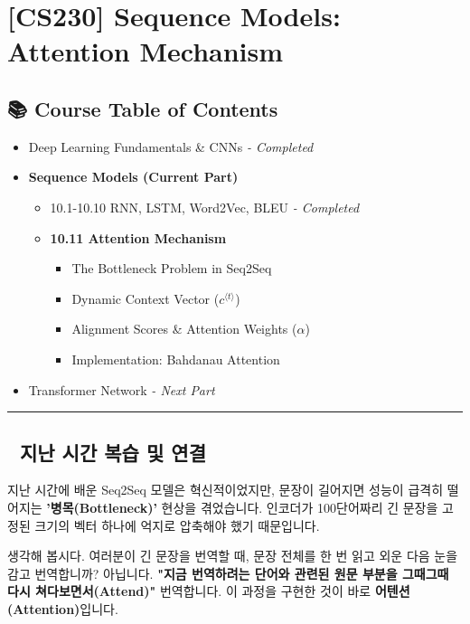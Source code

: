\documentclass[11pt,a4paper]{book}
\theoremstyle{definition}
\begin{document}
\chapter{[CS230] Sequence Models: \\ Attention Mechanism}
\label{ch:lecture49}

\section*{📚 Course Table of Contents}
\begin{itemize}
    \item[Chapter 1-9.] Deep Learning Fundamentals \& CNNs \textit{- Completed}
    \item[\textbf{Chapter 10.}] \textbf{Sequence Models (Current Part)}
    \begin{itemize}
        \item 10.1-10.10 RNN, LSTM, Word2Vec, BLEU \textit{- Completed}
        \item \textbf{10.11 Attention Mechanism}
        \begin{itemize}
            \item The Bottleneck Problem in Seq2Seq
            \item Dynamic Context Vector ($c^{\langle t \rangle}$)
            \item Alignment Scores \& Attention Weights ($\alpha$)
            \item Implementation: Bahdanau Attention
        \end{itemize}
    \end{itemize}
    \item[Chapter 11.] Transformer Network \textit{- Next Part}
\end{itemize}

\vspace{0.5cm}
\hrule
\vspace{0.5cm}

\section*{🔗 지난 시간 복습 및 연결}
지난 시간에 배운 Seq2Seq 모델은 혁신적이었지만, 문장이 길어지면 성능이 급격히 떨어지는 \textbf{'병목(Bottleneck)'} 현상을 겪었습니다. 인코더가 100단어짜리 긴 문장을 고정된 크기의 벡터 하나에 억지로 압축해야 했기 때문입니다.

생각해 봅시다. 여러분이 긴 문장을 번역할 때, 문장 전체를 한 번 읽고 외운 다음 눈을 감고 번역합니까? 아닙니다. \textbf{"지금 번역하려는 단어와 관련된 원문 부분을 그때그때 다시 쳐다보면서(Attend)"} 번역합니다. 이 과정을 구현한 것이 바로 \textbf{어텐션(Attention)}입니다.
\end{document}

